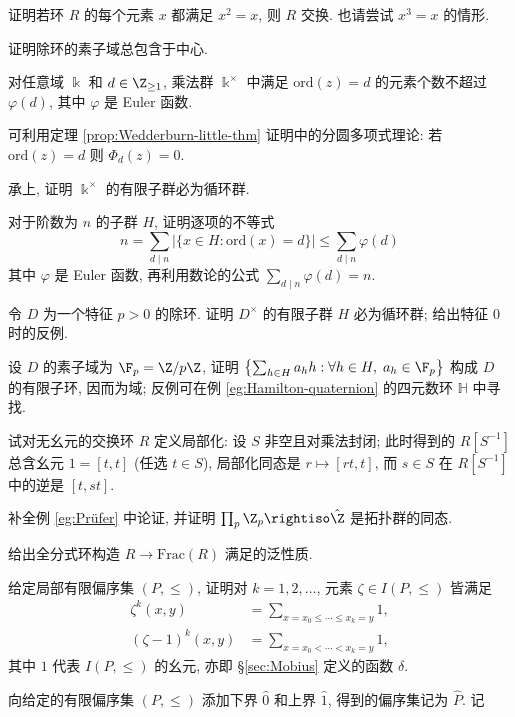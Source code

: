 \begin{Exercises}
	\item 证明若环 $R$ 的每个元素 $x$ 都满足 $x^2=x$, 则 $R$ 交换. 也请尝试 $x^3=x$ 的情形.
	\item 证明除环的素子域总包含于中心.
	\item 对任意域 $\Bbbk$ 和 $d \in \Z_{\geq 1}$, 乘法群 $\Bbbk^\times$ 中满足 $\text{ord}(z)=d$ 的元素个数不超过 $\varphi(d)$, 其中 $\varphi$ 是 Euler 函数.
	\begin{hint} 可利用定理 \ref{prop:Wedderburn-little-thm} 证明中的分圆多项式理论: 若 $\text{ord}(z)=d$ 则 $\Phi_d(z)=0$.\end{hint}
	\item 承上, 证明 $\Bbbk^\times$ 的有限子群必为循环群.
		\begin{hint}
		对于阶数为 $n$ 的子群 $H$, 证明逐项的不等式
			\[ n = \sum_{d \mid n} |\{ x \in H : \text{ord}(x)=d \}| \leq \sum_{d \mid n} \varphi(d) \]
		其中 $\varphi$ 是 Euler 函数, 再利用数论的公式 $\sum_{d \mid n} \varphi(d) = n$.
		\end{hint}
	\item 令 $D$ 为一个特征 $p>0$ 的除环. 证明 $D^\times$ 的有限子群 $H$ 必为循环群; 给出特征 $0$ 时的反例.
	\begin{hint}
		设 $D$ 的素子域为 $\F_p = \Z/p\Z$, 证明 $\left\{ \sum_{h \in H} a_h h : \forall h \in H, \; a_h \in \F_p \right\}$ 构成 $D$ 的有限子环, 因而为域; 反例可在例 \ref{eg:Hamilton-quaternion} 的四元数环 $\mathbb{H}$ 中寻找.
	\end{hint}
	\item 试对无幺元的交换环 $R$ 定义局部化: 设 $S$ 非空且对乘法封闭; 此时得到的 $R[S^{-1}]$ 总含幺元 $1 = [t,t]$ (任选 $t \in S$), 局部化同态是 $r \mapsto [rt,t]$, 而 $s \in S$ 在 $R[S^{-1}]$ 中的逆是 $[t,st]$.
	\item 补全例 \ref{eg:Prüfer} 中论证, 并证明 $\prod_p \Z_p \rightiso \hat{\Z}$ 是拓扑群的同态.
	\item 给出全分式环构造 $R \to \text{Frac}(R)$ 满足的泛性质.
	\item 给定局部有限偏序集 $(P, \leq)$, 证明对 $k=1,2,\ldots$, 元素 $\zeta \in I(P, \leq)$ 皆满足
		\begin{align*}
			\zeta^k(x,y) & = \sum_{x = x_0 \leq \cdots \leq x_k = y} 1, \\
			(\zeta - 1)^k(x,y) & = \sum_{x = x_0 < \cdots < x_k = y} 1,
		\end{align*}
		其中 $1$ 代表 $I(P,\leq)$ 的幺元, 亦即 \S\ref{sec:Mobius} 定义的函数 $\delta$.
	\item 向给定的有限偏序集 $(P,\leq)$ 添加下界 $\hat{0}$ 和上界 $\hat{1}$, 得到的偏序集记为 $\hat{P}$. 记

\end{Exercises}
